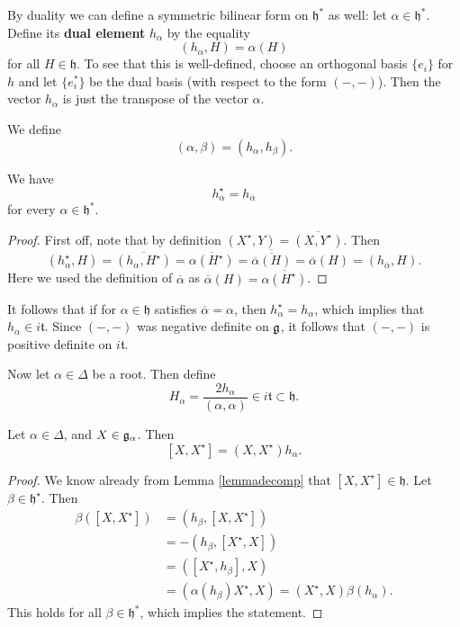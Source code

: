 \documentclass[11pt, english]{article}
\begin{document}
By duality we can define a symmetric bilinear form on $\mathfrak h^\ast$ as well: let $\alpha \in \mathfrak h^\ast$. Define its \textbf{dual element} $h_\alpha$ by the equality
$$
(h_\alpha, H) = \alpha(H)
$$
for all $H \in \mathfrak h$. To see that this is well-defined, choose an orthogonal basis $\{ e_i \}$ for $h$ and let $\{ e_i^\ast \}$ be the dual basis (with respect to the form $(-,-)$). Then the vector $h_\alpha$ is just the transpose of the vector $\alpha$. 

We define 
$$
(\alpha,\beta) = (h_\alpha, h_\beta).
$$


\begin{lemma}
We have
$$
h_\alpha^\star = h_{\overline \alpha}
$$
for every $\alpha \in \mathfrak h^\ast$.
\end{lemma}
\begin{proof}
First off, note that by definition $(X^\star, Y) = \overline{(X,Y^\star)}$. Then
$$
(h_\alpha^\star, H) = \overline{(h_\alpha, H^\star)} = \overline{\alpha(H^\star)} = \overline{\overline{\overline \alpha(H)}} = \overline{\alpha} (H) = (h_{\overline \alpha},H).
$$
Here we used the definition of $\overline \alpha$ as $\overline \alpha(H) = \overline{\alpha(H^\star)}$.
\end{proof}

It follows that if for $\alpha \in \mathfrak h$ satisfies $\overline \alpha = \alpha$, then $h_\alpha^\star = h_\alpha$, which implies that $h_\alpha \in i \mathfrak t$. Since $(-,-)$ was negative definite on $\mathfrak g$, it follows that $(-,-)$ is positive definite on $i \mathfrak t$. 

Now let $\alpha \in \Delta$ be a root. Then define
$$
H_\alpha = \frac{2 h_\alpha}{(\alpha,\alpha)} \in i \mathfrak t \subset \mathfrak h.
$$

\begin{lemma}
Let $\alpha \in \Delta$, and $X \in \mathfrak g_\alpha$. Then
$$
[X,X^\star] = (X,X^\star) h_\alpha.
$$
\end{lemma}
\begin{proof}
We know already from Lemma \eqref{lemmadecomp} that $[X,X^\star] \in \mathfrak h$. Let $\beta \in \mathfrak h^\star$. Then
\begin{align*}
\beta([X,X^\star]) &= (h_\beta,[X,X^\star]) \\
&= -(h_\beta,[X^\star,X]) \\
&= ([X^\star, h_\beta],X) \\
&= (\alpha(h_\beta) X^\star,X) = (X^\star,X) \beta(h_\alpha).
\end{align*}
This holds for all $\beta \in \mathfrak h^\ast$, which implies the statement.
\end{proof}
\end{document}
